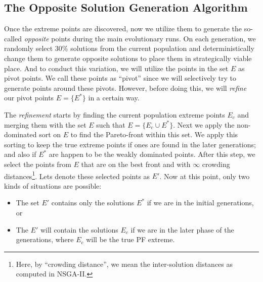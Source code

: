 \documentclass[journal]{IEEEtran}
\begin{document}
\subsection{The Opposite Solution Generation Algorithm}
\label{sec:main-algo}
Once the extreme points are discovered, now we utilize them to generate the so-called \textit{opposite} points during the main evolutionary runs. On each generation, we randomly select 30\% solutions from the current population and deterministically change them to generate opposite solutions to place them in strategically viable place. And to conduct this variation, we will utilize the points in the set \(E\) as pivot points. We call these points as ``pivot'' since we will selectively try to generate points around these pivots. However, before doing this, we will \textit{refine} our pivot points \(E = \{E^\ast\}\) in a certain way. 

The \textit{refinement} starts by finding the current population extreme points \(E_c\) and merging them with the set \(E\) such that \(E = \{E_c \cup E^\ast\}\). Next we apply the non-dominated sort on \(E\) to find the Pareto-front within this set. We apply this sorting to keep the true extreme points if ones are found in the later generations; and also if \(E^\ast\) are happen to be the weakly dominated points. After this step, we select the points from \(E\) that are on the best front and with \(\infty\) crowding distances\footnote{Here, by ``crowding distance'', we mean the inter-solution distances as computed in NSGA-II.}. Lets denote these selected points as \(E'\). Now at this point, only two kinds of situations are possible:
%
\begin{itemize}
	\item The set \(E'\) contains only the solutions \(E^\ast\) if we are in the initial generations, or
	\item The \(E'\) will contain the solutions \(E_c\) if we are in the later phase of the generations, where \(E_c\) will be the true PF extreme. 
\end{itemize}
%
\end{document}
